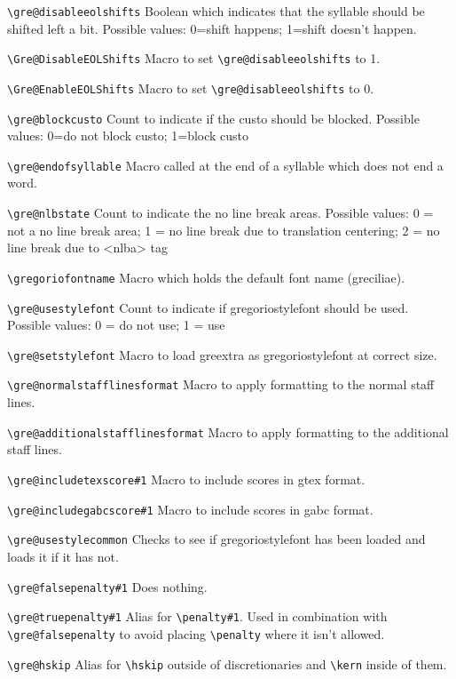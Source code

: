 \verb=\gre@disableeolshifts=%
	Boolean which indicates that the syllable should be shifted left a bit.
	Possible values: 0=shift happens; 1=shift doesn't happen.

\verb=\Gre@DisableEOLShifts=%
	Macro to set \verb=\gre@disableeolshifts= to 1.

\verb=\Gre@EnableEOLShifts=%
	Macro to set \verb=\gre@disableeolshifts= to 0.

\verb=\gre@blockcusto=%
	Count to indicate if the custo should be blocked.
	Possible values: 0=do not block custo; 1=block custo

\verb=\gre@endofsyllable=%
	Macro called at the end of a syllable which does not end a word.

\verb=\gre@nlbstate=%
	Count to indicate the no line break areas.
	Possible values: 0 = not a no line break area; 1 = no line break due to translation centering; 2 = no line break due to <nlba> tag

\verb=\gregoriofontname=%
	Macro which holds the default font name (greciliae).

\verb=\gre@usestylefont=%
	Count to indicate if gregoriostylefont should be used.
	Possible values: 0 = do not use; 1 = use

\verb=\gre@setstylefont=%
	Macro to load greextra as gregoriostylefont at correct size.
	
\verb=\gre@normalstafflinesformat=%
	Macro to apply formatting to the normal staff lines.
	
\verb=\gre@additionalstafflinesformat=%
	Macro to apply formatting to the additional staff lines.

\verb=\gre@includetexscore#1=%
	Macro to include scores in gtex format.

\verb=\gre@includegabcscore#1=%
	Macro to include scores in gabc format.

\verb=\gre@usestylecommon=%
	Checks to see if gregoriostylefont has been loaded and loads it if it has not.

\verb=\gre@falsepenalty#1=%
	Does nothing.

\verb=\gre@truepenalty#1=%
	Alias for \verb=\penalty#1=.  Used in combination with \verb=\gre@falsepenalty= to avoid placing \verb=\penalty= where it isn't allowed.

\verb=\gre@hskip=%
	Alias for \verb=\hskip= outside of discretionaries and \verb=\kern= inside of them.

